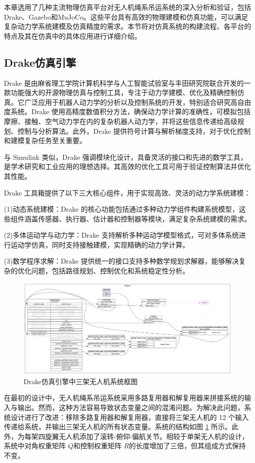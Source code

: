 \documentclass[lang=chs, degree=master, blindreview=true, winfonts=true]{yanputhesis}
\begin{document}
本章选用了几种主流物理仿真平台对无人机绳系吊运系统的深入分析和验证，包括Drake、Gazebo和MuJoCo。这些平台具有高效的物理建模和仿真功能，可以满足复杂动力学系统建模及仿真精度的需求。本节将对仿真系统的构建流程、各平台的特点及其在仿真中的具体应用进行详细介绍。



\subsection{Drake仿真引擎}

Drake 是由麻省理工学院计算机科学与人工智能试验室与丰田研究院联合开发的一款功能强大的开源物理仿真与控制工具，专注于动力学建模、优化及精确控制仿真。它广泛应用于机器人动力学的分析以及控制系统的开发，特别适合研究高自由度系统。Drake 使用高精度数值积分方法，确保动力学计算的准确性，可模拟包括摩擦、接触、空气动力学在内的复杂机器人动力学，并将这些信息传递给高级规划、控制与分析算法。此外，Drake 提供符号计算与解析梯度支持，对于优化控制和建模复杂任务至关重要。

与 Simulink 类似，Drake 强调模块化设计，具备灵活的接口和先进的数学工具，是学术研究和工业应用的理想选择。其高效的优化工具可用于验证控制算法并优化其性能。

Drake 工具箱提供了以下三大核心组件，用于实现高效、灵活的动力学系统建模：

(1)动态系统建模：Drake 的核心功能包括通过多种动力学组件构建系统模型，这些组件涵盖传感器、执行器、估计器和控制器等模块，满足复杂系统建模的需求。

(2)多体运动学与动力学：Drake 支持解析多种运动学模型格式，可对多体系统进行运动学仿真，同时支持接触建模，实现精确的动力学计算。

(3)数学程序求解：Drake 提供统一的接口支持多种数学规划求解器，能够解决复杂的优化问题，包括路径规划、控制优化和系统稳定性分析。

\begin{figure}[hbt!]
	\centering
	\includegraphics[width=38pc]{picture/drake.png} 
	\caption{Drake仿真引擎中三架无人机系统框图} 
	\label{drake}
\end{figure}
在最初的设计中，无人机绳系吊运系统采用多路复用器和解复用器来拼接系统的输入与输出。然而，这种方法容易导致状态变量之间的混淆问题。为解决此问题，系统设计进行了改进：移除多路复用器和解复用器，直接将三架无人机的 12 个输入传递给系统，并输出三架无人机的所有状态变量。系统的结构如图 \ref{drake} 所示。此外，为每架四旋翼无人机添加了滚转-俯仰-偏航关节。相较于单架无人机的设计，系统中对角权重矩阵 $Q$和控制权重矩阵 $R$的长度增加了三倍，但其组成方式保持不变。
\end{document}
